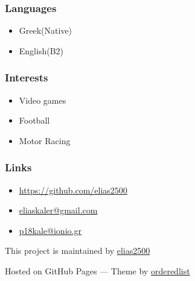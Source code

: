 \documentclass[american,]{article}
\providecommand{\tightlist}{%
  \setlength{\itemsep}{0pt}\setlength{\parskip}{0pt}}
\begin{document}
\hypertarget{languages}{%
\subsubsection{Languages}\label{languages}}

\begin{itemize}
\item
  Greek(Native)
\item
  English(B2)
\end{itemize}

\hypertarget{interests}{%
\subsubsection{Interests}\label{interests}}

\begin{itemize}
\item
  Video games
\item
  Football
\item
  Motor Racing
\end{itemize}

\hypertarget{links}{%
\subsubsection{Links}\label{links}}

\begin{itemize}
\tightlist
\item
  \url{https://github.com/elias2500}
\item
  \url{eliaskaler@gmail.com}
\item
  \url{p18kale@ionio.gr}
\end{itemize}

This project is maintained by
\href{https://github.com/elias2500}{elias2500}

{Hosted on GitHub Pages --- Theme by
\href{https://github.com/orderedlist}{orderedlist}}
\end{document}
